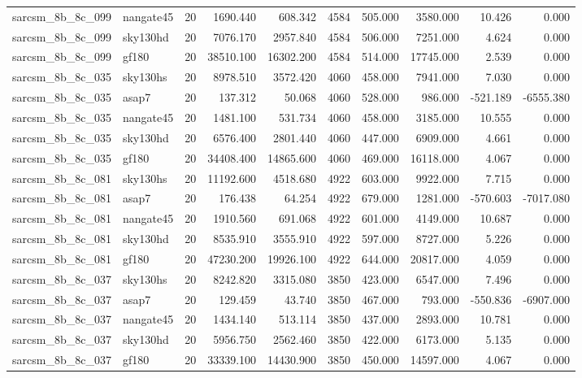 \documentclass{article}
\begin{document}
\begin{longtable}{llrrrrrrrr}
sarcsm\_8b\_8c\_099 & nangate45 & 20 & 1690.440 & 608.342 & 4584 & 505.000 & 3580.000 & 10.426 & 0.000 \\
sarcsm\_8b\_8c\_099 & sky130hd & 20 & 7076.170 & 2957.840 & 4584 & 506.000 & 7251.000 & 4.624 & 0.000 \\
sarcsm\_8b\_8c\_099 & gf180 & 20 & 38510.100 & 16302.200 & 4584 & 514.000 & 17745.000 & 2.539 & 0.000 \\
sarcsm\_8b\_8c\_035 & sky130hs & 20 & 8978.510 & 3572.420 & 4060 & 458.000 & 7941.000 & 7.030 & 0.000 \\
sarcsm\_8b\_8c\_035 & asap7 & 20 & 137.312 & 50.068 & 4060 & 528.000 & 986.000 & -521.189 & -6555.380 \\
sarcsm\_8b\_8c\_035 & nangate45 & 20 & 1481.100 & 531.734 & 4060 & 458.000 & 3185.000 & 10.555 & 0.000 \\
sarcsm\_8b\_8c\_035 & sky130hd & 20 & 6576.400 & 2801.440 & 4060 & 447.000 & 6909.000 & 4.661 & 0.000 \\
sarcsm\_8b\_8c\_035 & gf180 & 20 & 34408.400 & 14865.600 & 4060 & 469.000 & 16118.000 & 4.067 & 0.000 \\
sarcsm\_8b\_8c\_081 & sky130hs & 20 & 11192.600 & 4518.680 & 4922 & 603.000 & 9922.000 & 7.715 & 0.000 \\
sarcsm\_8b\_8c\_081 & asap7 & 20 & 176.438 & 64.254 & 4922 & 679.000 & 1281.000 & -570.603 & -7017.080 \\
sarcsm\_8b\_8c\_081 & nangate45 & 20 & 1910.560 & 691.068 & 4922 & 601.000 & 4149.000 & 10.687 & 0.000 \\
sarcsm\_8b\_8c\_081 & sky130hd & 20 & 8535.910 & 3555.910 & 4922 & 597.000 & 8727.000 & 5.226 & 0.000 \\
sarcsm\_8b\_8c\_081 & gf180 & 20 & 47230.200 & 19926.100 & 4922 & 644.000 & 20817.000 & 4.059 & 0.000 \\
sarcsm\_8b\_8c\_037 & sky130hs & 20 & 8242.820 & 3315.080 & 3850 & 423.000 & 6547.000 & 7.496 & 0.000 \\
sarcsm\_8b\_8c\_037 & asap7 & 20 & 129.459 & 43.740 & 3850 & 467.000 & 793.000 & -550.836 & -6907.000 \\
sarcsm\_8b\_8c\_037 & nangate45 & 20 & 1434.140 & 513.114 & 3850 & 437.000 & 2893.000 & 10.781 & 0.000 \\
sarcsm\_8b\_8c\_037 & sky130hd & 20 & 5956.750 & 2562.460 & 3850 & 422.000 & 6173.000 & 5.135 & 0.000 \\
sarcsm\_8b\_8c\_037 & gf180 & 20 & 33339.100 & 14430.900 & 3850 & 450.000 & 14597.000 & 4.067 & 0.000 \\

\end{longtable}
\end{document}
